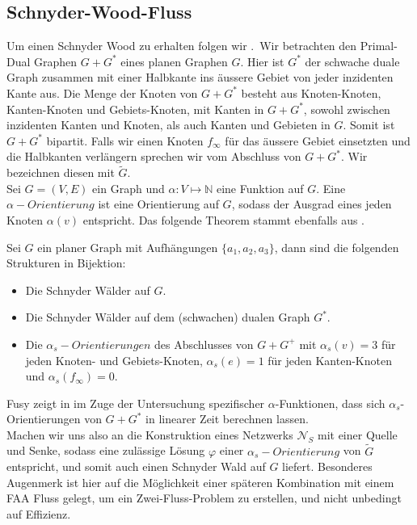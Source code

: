 \subsection{Schnyder-Wood-Fluss}

Um einen Schnyder Wood zu erhalten folgen wir \cite{felsner04}.\
Wir betrachten den Primal-Dual Graphen $G+G^*$ eines planen Graphen $G$. Hier ist $G^*$ der schwache duale Graph zusammen mit einer Halbkante ins äussere Gebiet von jeder inzidenten Kante aus. Die Menge der Knoten von $G+G^*$ besteht aus Knoten-Knoten, Kanten-Knoten und Gebiets-Knoten, mit Kanten in $G+G^*$, sowohl zwischen inzidenten Kanten und Knoten, als auch Kanten und Gebieten in $G$. Somit ist $G+G^*$ bipartit. Falls wir einen Knoten $f_\infty$ für das äussere Gebiet einsetzten und die Halbkanten verlängern sprechen wir vom Abschluss von $G+G^*$. Wir bezeichnen diesen mit $\tilde{G}$.\\
Sei $G=(V,E)$ ein Graph und $\alpha:V\mapsto\mathbb{N}$ eine Funktion auf $G$. Eine $\alpha-Orientierung$ ist eine Orientierung auf $G$, sodass der Ausgrad eines jeden Knoten $\alpha(v)$ entspricht. Das folgende Theorem stammt ebenfalls aus \cite{felsner04lattice}.

\begin{theorem}\label{alpha_bij}
Sei $G$ ein planer Graph mit Aufhängungen $\{a_1,a_2,a_3\}$, dann sind die folgenden Strukturen in Bijektion:
\begin{itemize}
\item Die Schnyder Wälder auf $G$.
\item Die Schnyder Wälder auf dem (schwachen) dualen Graph $G^*$.
\item Die $\alpha_{s}-Orientierungen$ des Abschlusses von $G+G^+$ mit $\alpha_s(v) = 3$ für jeden Knoten- und Gebiets-Knoten,  $\alpha_s(e) = 1$ für jeden Kanten-Knoten und  $\alpha_s(f_\infty) = 0$.
\end{itemize}
\end{theorem}

Fusy zeigt in \cite{fusy07} im Zuge der Untersuchung spezifischer $\alpha$-Funktionen, dass sich $\alpha_s$-Orientierungen von $G+G^*$ in linearer Zeit berechnen lassen.\\

Machen wir uns also an die Konstruktion eines Netzwerks $\mathcal{N}_S$ mit einer Quelle und Senke, sodass eine zulässige Lösung $\varphi$ einer $\alpha_s-Orientierung$ von $\tilde{G}$ entspricht, und somit auch einen Schnyder Wald auf $G$ liefert. Besonderes Augenmerk ist hier auf die Möglichkeit einer späteren Kombination mit einem FAA Fluss gelegt, um ein Zwei-Fluss-Problem zu erstellen, und nicht unbedingt auf Effizienz.\

